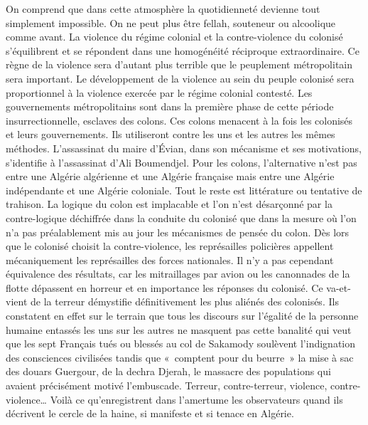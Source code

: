 \documentclass[french,twoside]{book} %
\begin{document}
\noindent On comprend que dans cette atmosphère la quotidienneté devienne tout simplement impossible. On ne peut plus être fellah, souteneur ou alcoolique comme avant. La violence du régime colonial et la contre-violence du colonisé s’équilibrent et se répondent dans une homogénéité réciproque extraordinaire. Ce règne de la violence sera d’autant plus terrible que le peuplement métropolitain sera important. Le développement de la   violence au sein du peuple colonisé sera proportionnel à la violence exercée par le régime colonial contesté. Les gouvernements métropolitains sont dans la première phase de cette période insurrectionnelle, esclaves des colons. Ces colons menacent à la fois les colonisés et leurs gouvernements. Ils utiliseront contre les uns et les autres les mêmes méthodes. L’assassinat du maire d’Évian, dans son mécanisme et ses motivations, s’identifie à l’assassinat d’Ali Boumendjel. Pour les colons, l’alternative n’est pas entre une Algérie algérienne et une Algérie française mais entre une Algérie indépendante et une Algérie coloniale. Tout le reste est littérature ou tentative de trahison. La logique du colon est implacable et l’on n’est désarçonné par la contre-logique déchiffrée dans la conduite du colonisé que dans la mesure où l’on n’a pas préalablement mis au jour les mécanismes de pensée du colon. Dès lors que le colonisé choisit la contre-violence, les représailles policières appellent mécaniquement les représailles des forces nationales. Il n’y a pas cependant équivalence des résultats, car les mitraillages par avion ou les canonnades de la flotte dépassent en horreur et en importance les réponses du colonisé. Ce va-et-vient de la terreur démystifie définitivement les plus aliénés des colonisés. Ils constatent en effet sur le terrain que tous les discours sur l’égalité de la personne humaine entassés les uns sur les autres ne masquent pas cette banalité qui veut que les sept Français tués ou blessés au col de Sakamody soulèvent l’indignation des consciences civilisées tandis que « comptent pour du beurre » la mise à sac des douars Guergour, de la dechra Djerah, le massacre des populations qui avaient précisément motivé l’embuscade. Terreur, contre-terreur, violence, contre-violence… Voilà ce qu’enregistrent dans l’amertume les observateurs quand ils décrivent le cercle de la haine, si manifeste et si tenace en Algérie.\par
\end{document}
